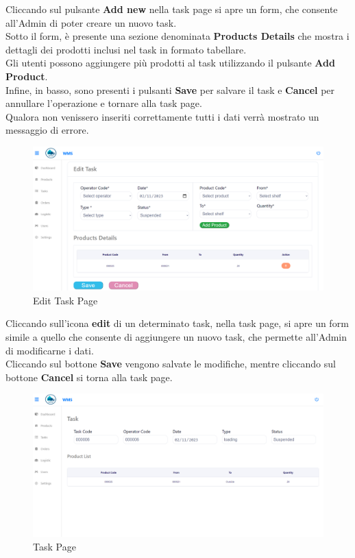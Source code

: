 Cliccando sul pulsante \textbf{Add new} nella task page si apre un form, che consente
all'Admin di poter creare un nuovo task.\\
Sotto il form, è presente una sezione denominata \textbf{Products Details} che mostra i dettagli dei prodotti inclusi
nel task in formato tabellare.\\Gli utenti possono aggiungere più prodotti al task utilizzando il pulsante \textbf{Add Product}.\\
Infine, in basso, sono presenti i pulsanti \textbf{Save} per salvare il task e \textbf{Cancel} per annullare l'operazione
e tornare alla task page.\\
Qualora non venissero inseriti correttamente tutti i dati verrà mostrato un messaggio di errore.

\begin{figure}[H]
    \centering
    \includegraphics[width=\textwidth]{document/sections/img/Storyboard/editTaskPage.png}
    \caption{Edit Task Page}
    \label{fig:editTaskPage}
\end{figure}

Cliccando sull'icona \textbf{edit} di un determinato task, nella task page, si apre un form simile a quello che
consente di aggiungere un nuovo task, che permette all'Admin di modificarne i dati.\\
Cliccando sul bottone \textbf{Save} vengono salvate le modifiche, mentre cliccando sul bottone \textbf{Cancel} si torna alla task page.

\begin{figure}[H]
    \centering
    \includegraphics[width=\textwidth]{document/sections/img/Storyboard/viewTask.png}
    \caption{Task Page}
    \label{fig:viewTasksPage}
\end{figure}

